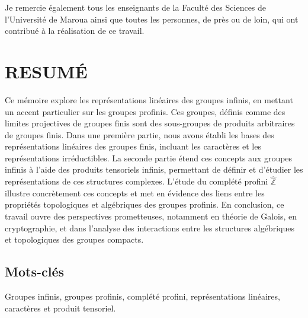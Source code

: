 \documentclass[a4paper, 14pt]{report}
\newcommand{\applyfontsize}{%
	\fontsize{12}{12}\selectfont
}
\begin{document}
\begin{onehalfspace}
{Je remercie également tous les enseignants de la Faculté des Sciences de l’Université de Maroua ainsi que toutes les personnes, de près ou de loin, qui ont contribué à la réalisation de ce travail.


}

{
	\applyfontsize %
	
\tableofcontents
}


\chapter*{RESUMÉ}
{
	\applyfontsize %
Ce mémoire explore les représentations linéaires des groupes infinis, en mettant un accent particulier sur les groupes profinis. Ces groupes, définis comme des limites projectives de groupes finis sont des sous-groupes de produits arbitraires de groupes finis. Dans une première partie, nous avons établi les bases des représentations linéaires des groupes finis, incluant les caractères et les représentations irréductibles. La seconde partie étend ces concepts aux groupes infinis à l’aide des produits tensoriels infinis, permettant de définir et d’étudier les représentations de ces structures complexes. L’étude du complété profini \( \widehat{\mathbb{Z}} \) illustre concrètement ces concepts et met en évidence des liens entre les propriétés topologiques et algébriques des groupes profinis. En conclusion, ce travail ouvre des perspectives prometteuses, notamment en théorie de Galois, en cryptographie, et dans l’analyse des interactions entre les structures algébriques et topologiques des groupes compacts.
	
	
	\section*{Mots-clés}
	Groupes infinis, groupes profinis, complété profini, représentations linéaires, caractères et produit tensoriel.
	
}



\end{onehalfspace}
\end{document}
